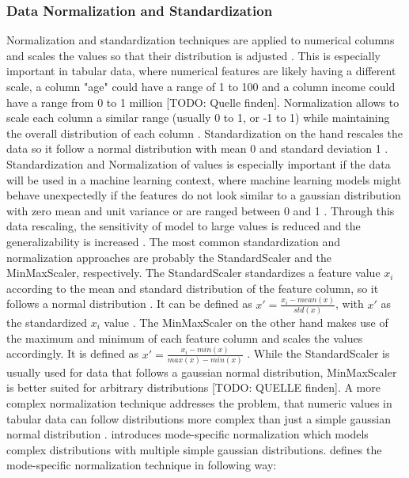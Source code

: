 \subsubsection{Data Normalization and Standardization}
\label{sec:dataNormalization} 

Normalization and standardization techniques are applied to numerical columns and scales the values so that their distribution is adjusted \cite{garcia2016BigDataPreprocessing}.
This is especially important in tabular data, where numerical features are likely having a different scale, \eg a column "age" could have a range of 1 to 100 and a column income could have a range from 0 to 1 million [TODO: Quelle finden].
Normalization allows to scale each column a similar range (usually 0 to 1, or -1 to 1) while maintaining the overall distribution of each column \cite{izonin2022TwoStepDataNormalization}.
Standardization on the hand rescales the data so it follow a normal distribution with mean 0 and standard deviation 1 \cite{scikit-learnPreprocessingData}.
Standardization and Normalization of values is especially important if the data will be used in a machine learning context, where machine learning models might behave unexpectedly if 
the features do not look similar to a gaussian distribution with zero mean and unit variance or are ranged between 0 and 1 \cite{scikit-learn, scikit-learnPreprocessingData}.
Through this data rescaling, the sensitivity of \gls{model} to large values is reduced and the generalizability is increased \cite{izonin2022TwoStepDataNormalization}.
The most common standardization and normalization approaches are probably the StandardScaler and the MinMaxScaler, respectively.
The StandardScaler standardizes a feature value $x_i$ according to the mean and standard distribution of the feature column, so it follows a normal distribution \cite{garcia2016BigDataPreprocessing, izonin2022TwoStepDataNormalization}.
It can be defined as $x' = \frac{x_i-mean(x)}{std(x)}$, with $x'$ as the standardized $x_i$ value \cite{izonin2022TwoStepDataNormalization}.
The MinMaxScaler on the other hand makes use of the maximum and minimum of each feature column and scales the values accordingly.
It is defined as $x' = \frac{x_i - min(x)}{max(x) - min(x)}$ \cite{izonin2022TwoStepDataNormalization}.
While the StandardScaler is usually used for data that follows a gaussian normal distribution, MinMaxScaler is better suited for arbitrary distributions [TODO: QUELLE finden].
A more complex normalization technique addresses the problem, that numeric values in tabular data can follow distributions more complex than just a simple gaussian normal distribution \cite{zhao2022CTABGANEnhancingTabular, xu2019ModelingTabularData}.
\cite{xu2019ModelingTabularData} introduces mode-specific normalization which models complex distributions with multiple simple gaussian distributions.
\cite[p. 3-4]{xu2019ModelingTabularData} defines the mode-specific normalization technique in following way:

